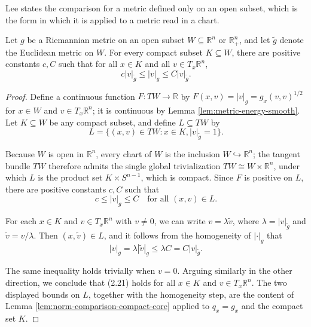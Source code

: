 Lee states the comparison for a metric defined only on an open subset, which is the form in
which it is applied to a metric read in a chart.

\begin{lemma}
\label{lem:riemannian-euclidean-norm-comparison}
\leanok
{}

Let $g$ be a Riemannian metric on an open subset $W \subseteq \mathbb{R}^n$ or $\mathbb{R}^n_+$, and let $\tilde{g}$ denote the Euclidean metric on $W$. For every compact subset $K \subseteq W$, there are positive constants $c, C$ such that for all $x \in K$ and all $v \in T_x \mathbb{R}^n$,
\begin{equation}
c|v|_{\tilde{g}} \leq |v|_g \leq C|v|_{\tilde{g}}.
\tag{2.21}
\end{equation}

\end{lemma}

\begin{proof}
\leanok
{}
Define a continuous function $F: TW \to \mathbb{R}$ by $F(x, v) = |v|_g = g_x(v, v)^{1/2}$ for $x \in W$ and $v \in T_x \mathbb{R}^n$; it is continuous by Lemma \ref{lem:metric-energy-smooth}. Let $K \subseteq W$ be any compact subset, and define $L \subseteq TW$ by
\[
L = \{(x, v) \in TW : x \in K, |v|_{\tilde{g}} = 1\}.
\]

Because $W$ is open in $\mathbb{R}^n$, every chart of $W$ is the inclusion $W \hookrightarrow \mathbb{R}^n$; the tangent bundle $TW$ therefore admits the single global trivialization $TW \cong W \times \mathbb{R}^n$, under which $L$ is the product set $K \times S^{n-1}$, which is compact. Since $F$ is positive on $L$, there are positive constants $c, C$ such that
\[
c \leq |v|_g \leq C \quad \text{for all } (x, v) \in L.
\]

For each $x \in K$ and $v \in T_x \mathbb{R}^n$ with $v \neq 0$, we can write $v = \lambda \tilde{v}$, where $\lambda = |v|_{\tilde{g}}$ and $\tilde{v} = v/\lambda$. Then $(x, \tilde{v}) \in L$, and it follows from the homogeneity of $|\cdot|_g$ that
\[
|v|_g = \lambda |\tilde{v}|_g \leq \lambda C = C|v|_{\tilde{g}}.
\]

The same inequality holds trivially when $v = 0$. Arguing similarly in the other direction, we conclude that (2.21) holds for all $x \in K$ and $v \in T_x \mathbb{R}^n$. The two displayed bounds on $L$, together with the homogeneity step, are the content of Lemma \ref{lem:norm-comparison-compact-core} applied to $q_x = g_x$ and the compact set $K$.
\end{proof}

